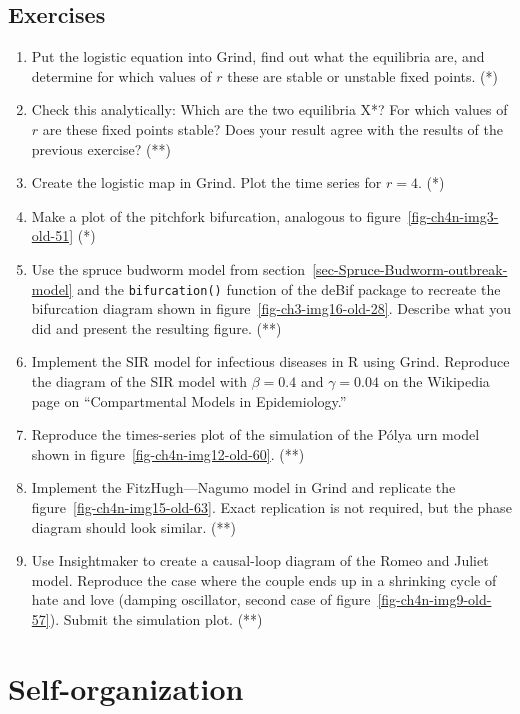 \documentclass[
  a4paper,
  DIV=11,
  numbers=noendperiod,
  oneside]{scrreprt}
\begin{document}
\section{Exercises}\label{sec-Exercises-ch4n}

\begin{enumerate}
\def\labelenumi{\arabic{enumi})}
\item
  Put the logistic equation into Grind, find out what the equilibria
  are, and determine for which values of \(r\) these are stable or
  unstable fixed points. (*)
\item
  Check this analytically: Which are the two equilibria X*? For which
  values of \(r\) are these fixed points stable? Does your result agree
  with the results of the previous exercise? (**)
\item
  Create the logistic map in Grind. Plot the time series for \(r = 4\).
  (*)
\item
  Make a plot of the pitchfork bifurcation, analogous to
  figure~\ref{fig-ch4n-img3-old-51} (*)
\item
  Use the spruce budworm model from
  section~\ref{sec-Spruce-Budworm-outbreak-model} and the
  \texttt{bifurcation()} function of the deBif package to recreate the
  bifurcation diagram shown in figure~\ref{fig-ch3-img16-old-28}.
  Describe what you did and present the resulting figure. (**)
\item
  Implement the SIR model for infectious diseases in R using Grind.
  Reproduce the diagram of the SIR model with \(\beta = 0.4\) and
  \(\gamma = 0.04\) on the Wikipedia page on ``Compartmental Models in
  Epidemiology.''
\item
  Reproduce the times-series plot of the simulation of the Pólya urn
  model shown in figure~\ref{fig-ch4n-img12-old-60}. (**)
\item
  Implement the FitzHugh---Nagumo model in Grind and replicate the
  figure~\ref{fig-ch4n-img15-old-63}. Exact replication is not required,
  but the phase diagram should look similar. (**)
\item
  Use Insightmaker to create a causal-loop diagram of the Romeo and
  Juliet model. Reproduce the case where the couple ends up in a
  shrinking cycle of hate and love (damping oscillator, second case of
  figure~\ref{fig-ch4n-img9-old-57}). Submit the simulation plot. (**)
\end{enumerate}


\chapter{Self-organization}\label{sec-ch5n}
\end{document}
